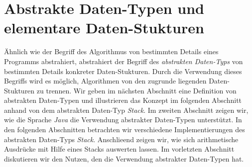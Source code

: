 \chapter{Abstrakte Daten-Typen und elementare Daten-Stukturen}
\"Ahnlich wie der Begriff des Algorithmus von bestimmten Details eines Programms
abstrahiert, abstrahiert der Begriff des \emph{abstrakten Daten-Typs} von bestimmten
Details konkreter Daten-Stukturen.  Durch die Verwendung dieses Begriffs wird es
m\"oglich, Algorithmen von den zugrunde liegenden Daten-Stukturen zu trennen.
Wir geben im n\"achsten Abschnitt eine Definition von abstrakten Daten-Typen und
illustrieren das Konzept im folgenden Abschnitt anhand von dem abstrakten Daten-Typ \textsl{Stack}.
Im zweiten Abschnitt zeigen wir, wie die Sprache \textsl{Java} die
Verwendung abstrakter Daten-Typen unterst\"utzt.  In den folgenden Abschnitten betrachten
wir verschiedene Implementierungen des abstrakten Daten-Typs \textsl{Stack}.
Anschlie\3end zeigen wir, wie sich arithmetische Ausdr\"ucke mit Hilfe eines Stacks
auswerten lassen.
Im vorletzten Abschnitt diskutieren wir den Nutzen, den die Verwendung abstrakter
Daten-Typen hat. 

